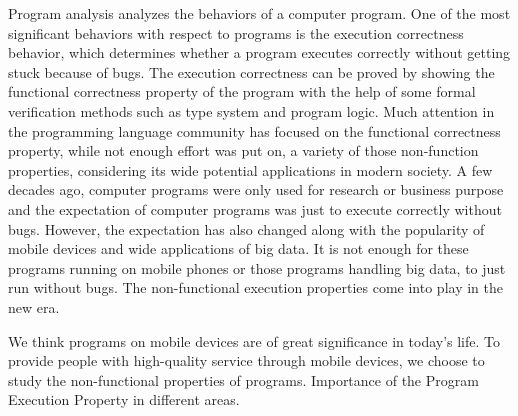 Program analysis analyzes the behaviors of a computer program.
One of the most significant behaviors with respect to programs is the execution correctness behavior, which determines whether a program executes correctly without getting stuck because of bugs.
 The execution correctness can be proved by showing the functional correctness property of the program with the help of some formal verification methods such as type system and program logic.
 Much attention in the programming language community has focused on the functional correctness property, while not enough effort was put on, a variety of those non-function properties, considering its wide potential applications in modern society. 
 A few decades ago, computer programs were only used for research or business purpose and the expectation of computer programs was just to execute correctly without bugs. 
 However, the expectation has also changed along with the popularity of mobile devices and wide applications of big data. 
 It is not enough for these programs running on mobile phones or those programs handling big data, 
 to just run without bugs. 
 The non-functional execution properties come into play in the new era.

 We think programs on mobile devices are of great significance in today's life.
 To provide people with high-quality
 service through mobile devices,
we choose to study the non-functional properties of programs.
Importance of the Program Execution Property in different areas.


